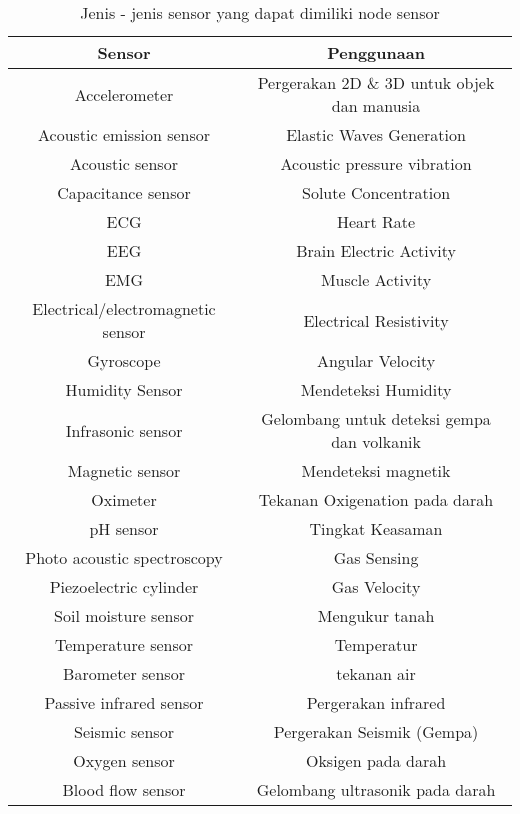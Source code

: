 \begin{table} [H]
	\centering 
	\caption{Jenis - jenis sensor yang dapat dimiliki node sensor}
	\label{tab:sensor}
	\begin{tabular}{|c|c|}
		\toprule
		Sensor & Penggunaan\\

		\midrule
		Accelerometer & Pergerakan 2D \& 3D untuk objek dan manusia  \\
		Acoustic emission sensor & Elastic Waves Generation\\
		Acoustic sensor   & Acoustic pressure vibration\\
		Capacitance sensor  & Solute Concentration\\
		ECG   & Heart Rate\\
		EEG  & Brain Electric Activity\\
		EMG   & Muscle Activity\\
		Electrical/electromagnetic sensor & Electrical Resistivity\\
		Gyroscope  & Angular Velocity \\
		Humidity Sensor   & Mendeteksi Humidity\\
		Infrasonic sensor  &  Gelombang untuk deteksi gempa dan volkanik\\
		Magnetic sensor   & Mendeteksi magnetik\\
		Oximeter   & Tekanan Oxigenation pada darah  \\
		pH sensor  & Tingkat Keasaman\\
		Photo acoustic spectroscopy   & Gas Sensing\\
		Piezoelectric cylinder    &  Gas Velocity\\
		Soil moisture sensor   &  Mengukur tanah\\
		Temperature sensor   & Temperatur \\
		Barometer sensor  &  tekanan air\\
		Passive infrared sensor  & Pergerakan infrared\\
		Seismic sensor   & Pergerakan Seismik (Gempa) \\
		Oxygen sensor  & Oksigen pada darah \\
		Blood flow sensor  & Gelombang ultrasonik pada darah \\

		\bottomrule
		
	\end{tabular} 
\end{table}


